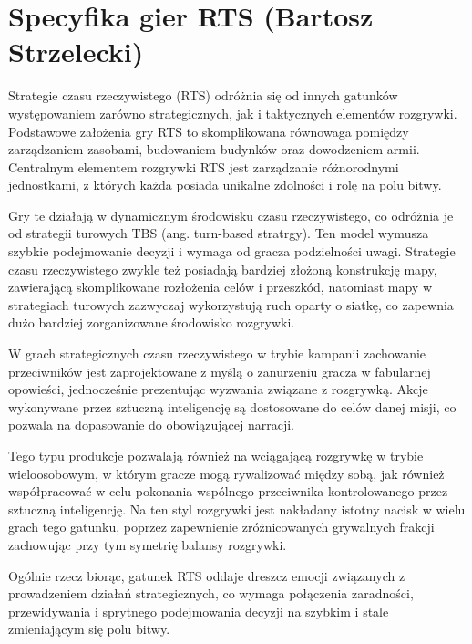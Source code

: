 \section{Specyfika gier RTS (Bartosz Strzelecki)}

Strategie czasu rzeczywistego (RTS) odróżnia się od innych gatunków występowaniem zarówno strategicznych, jak i taktycznych
elementów rozgrywki. Podstawowe założenia gry RTS to skomplikowana równowaga pomiędzy zarządzaniem zasobami, budowaniem budynków oraz
dowodzeniem armii. Centralnym elementem rozgrywki RTS jest zarządzanie różnorodnymi jednostkami, z których każda posiada unikalne zdolności i rolę na polu bitwy.

Gry te działają w dynamicznym środowisku czasu rzeczywistego, co odróżnia je od strategii turowych TBS (ang. turn-based stratrgy). Ten model wymusza szybkie podejmowanie decyzji
i wymaga od gracza podzielności uwagi. Strategie czasu rzeczywistego zwykle też posiadają bardziej złożoną konstrukcję mapy, zawierającą skomplikowane
rozłożenia celów i przeszkód, natomiast mapy w strategiach turowych zazwyczaj wykorzystują ruch oparty o siatkę, co zapewnia dużo bardziej
zorganizowane środowisko rozgrywki.

W grach strategicznych czasu rzeczywistego w trybie kampanii zachowanie przeciwników jest zaprojektowane z myślą o zanurzeniu gracza w fabularnej opowieści, jednocześnie
prezentując wyzwania związane z rozgrywką. Akcje wykonywane przez sztuczną inteligencję są dostosowane do celów danej misji, co pozwala
na dopasowanie do obowiązującej narracji.

Tego typu produkcje pozwalają również na wciągającą rozgrywkę w trybie wieloosobowym, w którym gracze mogą rywalizować między sobą, jak również
współpracować w celu pokonania wspólnego przeciwnika kontrolowanego przez sztuczną inteligencję. Na ten styl rozgrywki jest nakładany istotny nacisk
w wielu grach tego gatunku, poprzez zapewnienie zróżnicowanych grywalnych frakcji zachowując przy tym symetrię balansy rozgrywki.

Ogólnie rzecz biorąc, gatunek RTS oddaje dreszcz emocji związanych z prowadzeniem działań strategicznych, co wymaga połączenia zaradności,
przewidywania i sprytnego podejmowania decyzji na szybkim i stale zmieniającym się polu bitwy.
